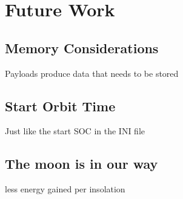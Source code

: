 \section{Future Work} \label{sec:future}

\subsection{Memory Considerations}
Payloads produce data that needs to be stored

\subsection{Start Orbit Time}
Just like the start SOC in the INI file

\subsection{The moon is in our way}
less energy gained per insolation